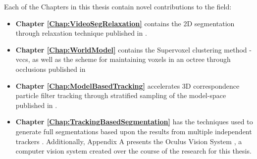 Each of the Chapters in this thesis contain novel contributions to the field: 
\begin{itemize}
\item {\bf Chapter \ref{Chap:VideoSegRelaxation} } contains the 2D segmentation through relaxation technique published in \cite{PartFilter_Papon_2012}. 

\item {\bf Chapter \ref{Chap:WorldModel} } contains the Supervoxel clustering method - \gls{vccs}, as well as the scheme for maintaining voxels in an octree through occlusions published in \cite{VCCS_Papon_2013}

\item {\bf Chapter \ref{Chap:ModelBasedTracking} } accelerates 3D correspondence particle filter tracking through stratified sampling of the model-space published in \cite{PaponWACV_2015}. 

\item {\bf Chapter \ref{Chap:TrackingBasedSegmentation} } has the techniques used to generate full segmentations based upon the results from multiple independent trackers \cite{PaponIros2013}. Additionally, Appendix A presents the Oculus Vision System \cite{Oculus_Papon_2012}, a computer vision system created over the course of the research for this thesis.
\end{itemize}

